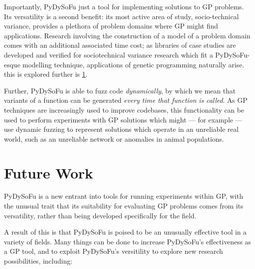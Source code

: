\documentclass[draft,12pt]{llncs}   %
\begin{document}
Importantly, PyDySoFu just a tool for implementing solutions to GP problems. Its
versatility is a second benefit: its most active area of study, socio-technical
variance, provides a plethora of problem domains where GP might find
applications. Research involving the construction of a model of a problem domain
comes with an additional associated time cost; as libraries of case studies are
developed and verified for sociotechnical variance research which fit a
PyDySoFu-esque modelling technique, applications of genetic programming
naturally arise. this is explored further is \cref{sec:future_work}.\par

Further, PyDySoFu is able to fuzz code \emph{dynamically}, by which we mean that variants
of a function can be generated \emph{every time that function is called}. As GP
techniques are increasingly used to improve codebases, this functionality can be
used to perform experiments with GP solutions which might --- for example ---
use dynamic fuzzing to represent solutions which operate in an unreliable real
world, such as an unreliable network or anomalies in animal populations.\par

\section{Future Work}
\label{sec:future_work}

PyDySoFu is a new entrant into tools for running experiments within GP, with the
unusual trait that its suitability for evaluating GP problems comes from its
versatility, rather than being developed specifically for the field.\par

A result of this is that PyDySoFu is poised to be an unusually effective tool in
a variety of fields. Many things can be done to increase PyDySoFu's
effectiveness as a GP tool, and to exploit PyDySoFu's versitility to explore new
research possibilities, including:
\end{document}
